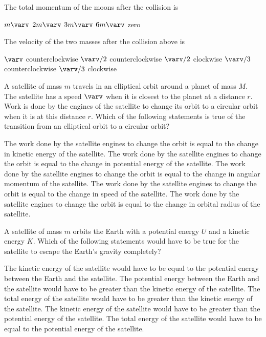 \documentclass{../../oss-classkick-exam}
\begin{document}
\begin{multicols*}{2}
\begin{questions}
    \question The total momentum of the moons after the collision is
    \label{moon1}
    \begin{choices}
      \choice $m\varv$
      \choice $2m\varv$
      \choice $3m\varv$
      \choice $6m\varv$
      \choice zero
    \end{choices}
    
    \question The velocity of the two masses after the collision above is
    \label{moon2}
    \begin{choices}
      \choice $\varv$ counterclockwise
      \choice $\varv/2$ counterclockwise
      \choice $\varv/2$ clockwise
      \choice $\varv/3$ counterclockwise
      \choice $\varv/3$ clockwise
    \end{choices}
    \vspace{.7in}
    
    \question A satellite of mass $m$ travels in an elliptical orbit around a
    planet of mass $M$. The satellite has a speed $\varv$ when it is closest to
    the planet at a distance $r$. Work is done by the engines of the satellite
    to change its orbit to a circular orbit when it is at this distance $r$.
    Which of the following statements is true of the transition from an
    elliptical orbit to a circular orbit?
    \begin{choices}
      \choice The work done by the satellite engines to change the orbit is
      equal to the change in kinetic energy of the satellite.
      \choice The work done by the satellite engines to change the orbit is
      equal to the change in potential energy of the satellite.
      \choice The work done by the satellite engines to change the orbit is
      equal to the change in angular momentum of the satellite.
      \choice The work done by the satellite engines to change the orbit is
      equal to the change in speed of the satellite.
      \choice The work done by the satellite engines to change the orbit is
      equal to the change in orbital radius of the satellite.
    \end{choices}
    \vspace{.7in}
    
    \question A satellite of mass $m$ orbits the Earth with a potential energy
    $U$ and a kinetic energy $K$. Which of the following statements would have
    to be true for the satellite to escape the Earth's gravity completely?
    \begin{choices}
      \choice The kinetic energy of the satellite would have to be equal to the
      potential energy between the Earth and the satellite.
      \choice The potential energy between the Earth and the satellite would
      have to be greater than the kinetic energy of the satellite.
      \choice The total energy of the satellite would have to be greater than
      the kinetic energy of the satellite.
      \choice The kinetic energy of the satellite would have to be greater than
      the potential energy of the satellite.
      \choice The total energy of the satellite would have to be equal to the
      potential energy of the satellite.
    \end{choices}
  \end{questions}
\end{multicols*}
\end{document}
